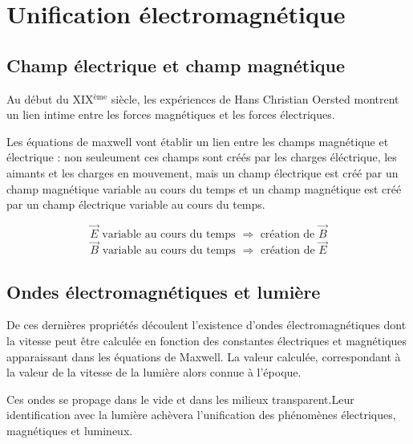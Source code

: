 
\section{Unification électromagnétique}

\subsection{Champ électrique et champ magnétique}

Au début du XIX$^\text{ème}$ siècle, les expériences de Hans Christian Oersted montrent un lien intime entre les forces magnétiques et les forces électriques.

Les équations de maxwell vont établir un lien entre les champs magnétique et électrique : non seuleument ces champs sont créés par les charges éléctrique, les aimants et les charges en mouvement, mais un champ électrique est créé par un champ magnétique variable au cours du temps et un champ magnétique est créé par un champ électrique variable au cours du temps.

\[
\overrightarrow{E} \text{ variable au cours du temps } \Rightarrow \text{ création de } \overrightarrow{B}
\]
\[
\overrightarrow{B} \text{ variable au cours du temps } \Rightarrow \text{ création de } \overrightarrow{E}
\]


\subsection{Ondes électromagnétiques et lumière}

De ces dernières propriétés découlent l'existence d'ondes électromagnétiques dont la vitesse peut être calculée en fonction des constantes électriques et magnétiques apparaissant dans les équations de Maxwell. La valeur calculée, correspondant à la valeur de la vitesse de la lumière alors connue à l'époque.

Ces ondes se propage dans le vide et dans les milieux transparent.Leur identification avec la lumière achèvera l'unification des phénomènes électriques, magnétiques et lumineux.

